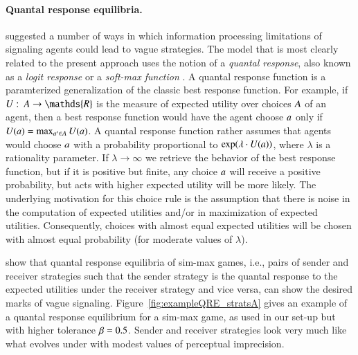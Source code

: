 \paragraph{Quantal response equilibria.}
\citet{FrankeJager2010:Vagueness-Signa} suggested a number of ways in
which information processing limitations of signaling agents could
lead to vague strategies. The model that is most clearly related to
the present approach uses the notion of a \emph{quantal response},
also known as a \emph{logit response} or a \emph{soft-max function}
\citep[e.g.][]{Luce1959:Individual-Choi,McFadden1976:Quantal-Choice-,McKelveyPalfrey1995:Quantal-Respons,McKelveyPalfrey1998:Quantal-Respons,GoereeHolt2008:Quantal-Respons}. A
quantal response function is a paramterized generalization of the
classic best response function. For example, if $U \mycolon \Acts
\rightarrow \mathds{R}$ is the measure of expected utility over
choices $A$ of an agent, then a best response function would have
the agent choose $a$ only if $U(a) = \max_{a' \in A}
U(a)$. A quantal response function rather assumes that agents would
choose $a$ with a probability proportional to $\operatorname{exp}(\lambda \cdot
U(a))$, where $\lambda$ is a rationality parameter. If $\lambda
\rightarrow \infty$ we retrieve the behavior of the best response
function, but if it is positive but finite, any choice $a$ will
receive a positive probability, but acts with higher expected utility
will be more likely. The underlying motivation for this choice rule is
the assumption that there is noise in the computation of expected
utilities and/or in maximization of expected utilities. Consequently,
choices with almost equal expected utilities will be chosen with
almost equal probability (for moderate values of $\lambda$).

\citet{FrankeJager2010:Vagueness-Signa} show that quantal response
equilibria of sim-max games, i.e., pairs of sender and receiver
strategies such that the sender strategy is the quantal response to
the expected utilities under the receiver strategy and vice versa, can
show the desired marks of vague
signaling. Figure~\ref{fig:exampleQRE_stratsA} gives an example of a
quantal response equilibrium for a sim-max game, as used in our set-up
but with higher tolerance $\beta = 0.5$. Sender and receiver
strategies look very much like what evolves under \rdd with modest
values of perceptual imprecision. 

